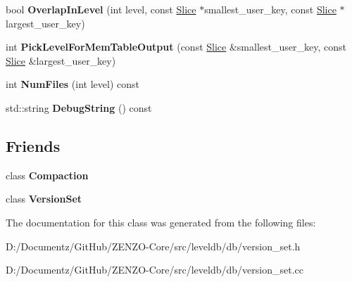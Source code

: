 \begin{DoxyCompactItemize}
\item 
\mbox{\label{classleveldb_1_1_version_a7945e88b8a4f2f7b6f3201cb3d791f1e}} 
bool {\bfseries Overlap\+In\+Level} (int level, const \mbox{\hyperlink{classleveldb_1_1_slice}{Slice}} $\ast$smallest\+\_\+user\+\_\+key, const \mbox{\hyperlink{classleveldb_1_1_slice}{Slice}} $\ast$largest\+\_\+user\+\_\+key)
\item 
\mbox{\label{classleveldb_1_1_version_ac3b623319110ed2a9491723dd4675431}} 
int {\bfseries Pick\+Level\+For\+Mem\+Table\+Output} (const \mbox{\hyperlink{classleveldb_1_1_slice}{Slice}} \&smallest\+\_\+user\+\_\+key, const \mbox{\hyperlink{classleveldb_1_1_slice}{Slice}} \&largest\+\_\+user\+\_\+key)
\item 
\mbox{\label{classleveldb_1_1_version_a3860dac2fe3c61ef20edb8482a2a3746}} 
int {\bfseries Num\+Files} (int level) const
\item 
\mbox{\label{classleveldb_1_1_version_abf1f1702c439aea453b041d5db6b7e63}} 
std\+::string {\bfseries Debug\+String} () const
\end{DoxyCompactItemize}
\subsection*{Friends}
\begin{DoxyCompactItemize}
\item 
\mbox{\label{classleveldb_1_1_version_a9372e882b35d27c78356228e4b758917}} 
class {\bfseries Compaction}
\item 
\mbox{\label{classleveldb_1_1_version_a1827cd1b4d6e9e3c378ce37ca3cce635}} 
class {\bfseries Version\+Set}
\end{DoxyCompactItemize}


The documentation for this class was generated from the following files\+:\begin{DoxyCompactItemize}
\item 
D\+:/\+Documentz/\+Git\+Hub/\+Z\+E\+N\+Z\+O-\/\+Core/src/leveldb/db/version\+\_\+set.\+h\item 
D\+:/\+Documentz/\+Git\+Hub/\+Z\+E\+N\+Z\+O-\/\+Core/src/leveldb/db/version\+\_\+set.\+cc\end{DoxyCompactItemize}
